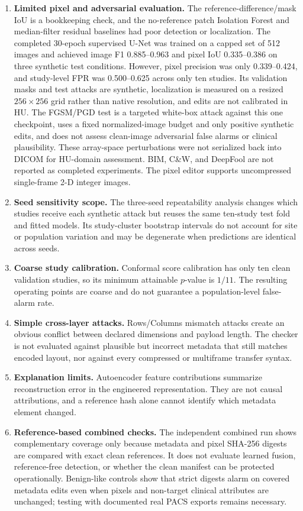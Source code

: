 \documentclass[journal]{IEEEtran}
\begin{document}
\begin{enumerate}[leftmargin=*]
    \item \textbf{Limited pixel and adversarial evaluation.} The reference-difference/mask IoU is a bookkeeping check, and the no-reference patch Isolation Forest and median-filter residual baselines had poor detection or localization. The completed 30-epoch supervised U-Net was trained on a capped set of 512 images and achieved image F1 0.885--0.963 and pixel IoU 0.335--0.386 on three synthetic test conditions. However, pixel precision was only 0.339--0.424, and study-level FPR was 0.500--0.625 across only ten studies. Its validation masks and test attacks are synthetic, localization is measured on a resized $256\times256$ grid rather than native resolution, and edits are not calibrated in HU. The FGSM/PGD test is a targeted white-box attack against this one checkpoint, uses a fixed normalized-image budget and only positive synthetic edits, and does not assess clean-image adversarial false alarms or clinical plausibility. These array-space perturbations were not serialized back into DICOM for HU-domain assessment. BIM, C\&W, and DeepFool are not reported as completed experiments. The pixel editor supports uncompressed single-frame 2-D integer images.
    \item \textbf{Seed sensitivity scope.} The three-seed repeatability analysis changes which studies receive each synthetic attack but reuses the same ten-study test fold and fitted models. Its study-cluster bootstrap intervals do not account for site or population variation and may be degenerate when predictions are identical across seeds.
    \item \textbf{Coarse study calibration.} Conformal score calibration has only ten clean validation studies, so its minimum attainable $p$-value is $1/11$. The resulting operating points are coarse and do not guarantee a population-level false-alarm rate.
    \item \textbf{Simple cross-layer attacks.} Rows/Columns mismatch attacks create an obvious conflict between declared dimensions and payload length. The checker is not evaluated against plausible but incorrect metadata that still matches encoded layout, nor against every compressed or multiframe transfer syntax.
    \item \textbf{Explanation limits.} Autoencoder feature contributions summarize reconstruction error in the engineered representation. They are not causal attributions, and a reference hash alone cannot identify which metadata element changed.
    \item \textbf{Reference-based combined checks.} The independent combined run shows complementary coverage only because metadata and pixel SHA-256 digests are compared with exact clean references. It does not evaluate learned fusion, reference-free detection, or whether the clean manifest can be protected operationally. Benign-like controls show that strict digests alarm on covered metadata edits even when pixels and non-target clinical attributes are unchanged; testing with documented real PACS exports remains necessary.

\end{enumerate}
\end{document}
